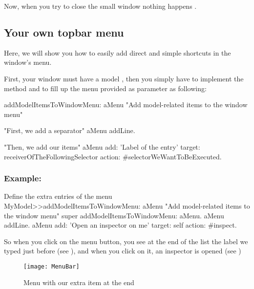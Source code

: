 \documentclass[a4paper,10pt,twoside]{book}
\begin{document}
Now, when you try to close the small window nothing happens .

\subsection{Your own topbar menu}

Here, we will show you how to easily add direct and simple shortcuts in the window's menu.

First, your window must have a model , then you simply have to implement the method  and to fill up the menu provided as parameter as following:

\begin{method}{}
addModelItemsToWindowMenu: aMenu
	"Add model-related items to the window menu"
	
	"First, we add a separator"
	aMenu addLine.
	
	"Then, we add our items"
	aMenu
		add: 'Label of the entry'
		target: receiverOfTheFollowingSelector
		action: #selectorWeWantToBeExecuted.

\end{method} 

\subsubsection{Example:}

\begin{method}{Define the extra entries of the menu}
MyModel>>addModelItemsToWindowMenu: aMenu
	"Add model-related items to the window menu"
	super addModelItemsToWindowMenu: aMenu.
	aMenu addLine.
	aMenu
		add: 'Open an inspector on me'
		target: self
		action: #inspect.
\end{method} 

So when you click on the menu button, you see at the end of the list the label we typed just before  (see ), and when you click on it, an inspector is opened (see )

\begin{figure}[ht]
\begin{center}
	\texttt{[image: MenuBar]}
	\caption{Menu with our extra item at the end}
\end{center}
\end{figure}
\end{document}
